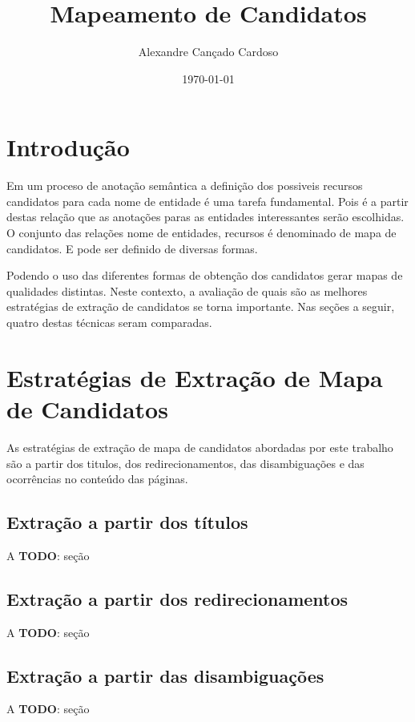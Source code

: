 \documentclass[10pt,a4paper]{llncs}
\title{Mapeamento de Candidatos}
\author{Alexandre Cançado Cardoso}
\institute{Intrinsic Soluções em Informática M.E.}
\date{\today}
\newcommand{\todo}[1]{{\color{red}\textsf{\textbf{TODO}}: #1}}
\begin{document}
\maketitle

\begin{abstract}
\end{abstract}

\section{Introdução} \label{introducao}
\indent\indent Em um proceso de anotação semântica a definição dos possiveis recursos candidatos para cada nome de entidade é uma tarefa fundamental. Pois é a partir destas relação que as anotações paras as entidades interessantes serão escolhidas. O conjunto das relações nome de entidades, recursos é denominado de mapa de candidatos. E pode ser definido de diversas formas.

Podendo o uso das diferentes formas de obtenção dos candidatos gerar mapas de qualidades distintas. Neste contexto, a avaliação de quais são as melhores estratégias de extração de candidatos se torna importante. Nas seções a seguir, quatro destas técnicas seram comparadas.


\section{Estratégias de Extração de Mapa de Candidatos} \label{extracao-mapa-candidatos}
\indent\indent As estratégias de extração de mapa de candidatos abordadas por este trabalho são a partir dos titulos, dos redirecionamentos, das disambiguações e das ocorrências no conteúdo das páginas.

\subsection{Extração a partir dos títulos} \label{extracao-titulos}
\indent\indent A
\todo{seção}

\subsection{Extração a partir dos redirecionamentos} \label{extracao-redirecionamentos}
\indent\indent A
\todo{seção}

\subsection{Extração a partir das disambiguações} \label{extracao-disambiguacoes}
\indent\indent A
\todo{seção}
\end{document}
